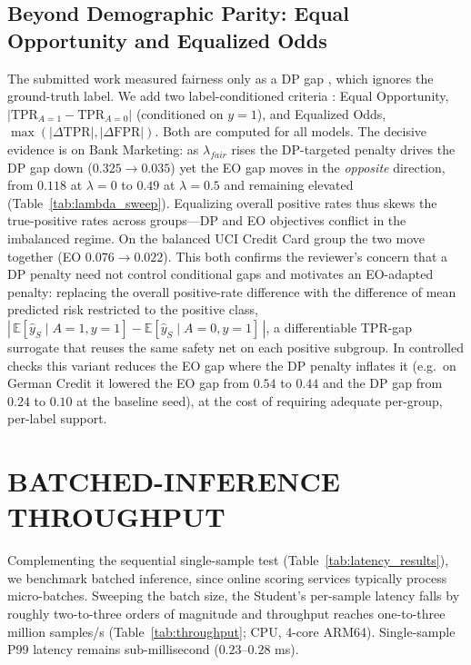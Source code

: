 \documentclass{wscpaperproc}
\theoremstyle{wsc}
\begin{document}
\subsection{Beyond Demographic Parity: Equal Opportunity and Equalized Odds}
\label{sec:eo}
The submitted work measured fairness only as a DP gap \cite{Dwork2012Fairness}, which ignores the ground-truth label. We add two label-conditioned criteria \cite{Hardt2016Equality}: Equal Opportunity, $|\mathrm{TPR}_{A=1}-\mathrm{TPR}_{A=0}|$ (conditioned on $y=1$), and Equalized Odds, $\max(|\Delta\mathrm{TPR}|,|\Delta\mathrm{FPR}|)$. Both are computed for all models. The decisive evidence is on Bank Marketing: as $\lambda_{fair}$ rises the DP-targeted penalty drives the DP gap down ($0.325\!\to\!0.035$) yet the EO gap moves in the \emph{opposite} direction, from $0.118$ at $\lambda{=}0$ to $0.49$ at $\lambda{=}0.5$ and remaining elevated (Table~\ref{tab:lambda_sweep}). Equalizing overall positive rates thus skews the true-positive rates across groups---DP and EO objectives conflict in the imbalanced regime. On the balanced UCI Credit Card group the two move together (EO $0.076\!\to\!0.022$). This both confirms the reviewer's concern that a DP penalty need not control conditional gaps and motivates an EO-adapted penalty: replacing the overall positive-rate difference with the difference of mean predicted risk restricted to the positive class, $|\,\mathbb{E}[\hat y_S\mid A{=}1,y{=}1]-\mathbb{E}[\hat y_S\mid A{=}0,y{=}1]\,|$, a differentiable TPR-gap surrogate that reuses the same safety net on each positive subgroup. In controlled checks this variant reduces the EO gap where the DP penalty inflates it (e.g.\ on German Credit it lowered the EO gap from $0.54$ to $0.44$ and the DP gap from $0.24$ to $0.10$ at the baseline seed), at the cost of requiring adequate per-group, per-label support.

\section{BATCHED-INFERENCE THROUGHPUT}
\label{sec:throughput}
Complementing the sequential single-sample test (Table~\ref{tab:latency_results}), we benchmark batched inference, since online scoring services typically process micro-batches. Sweeping the batch size, the Student's per-sample latency falls by roughly two-to-three orders of magnitude and throughput reaches one-to-three million samples/s (Table~\ref{tab:throughput}; CPU, 4-core ARM64). Single-sample P99 latency remains sub-millisecond ($0.23$--$0.28$ ms).
\end{document}

